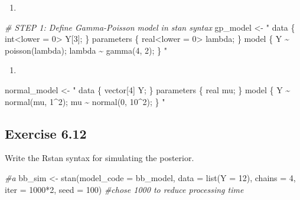 \documentclass[
]{article}
\newenvironment{Shaded}{\begin{snugshade}}{\end{snugshade}}
\newcommand{\AttributeTok}[1]{\textcolor[rgb]{0.77,0.63,0.00}{#1}}
\newcommand{\CommentTok}[1]{\textcolor[rgb]{0.56,0.35,0.01}{\textit{#1}}}
\newcommand{\DecValTok}[1]{\textcolor[rgb]{0.00,0.00,0.81}{#1}}
\newcommand{\FunctionTok}[1]{\textcolor[rgb]{0.00,0.00,0.00}{#1}}
\newcommand{\NormalTok}[1]{#1}
\newcommand{\OtherTok}[1]{\textcolor[rgb]{0.56,0.35,0.01}{#1}}
\newcommand{\SpecialCharTok}[1]{\textcolor[rgb]{0.00,0.00,0.00}{#1}}
\newcommand{\StringTok}[1]{\textcolor[rgb]{0.31,0.60,0.02}{#1}}
\providecommand{\tightlist}{%
  \setlength{\itemsep}{0pt}\setlength{\parskip}{0pt}}
\begin{document}
\begin{enumerate}
\def\labelenumi{\alph{enumi})}
\setcounter{enumi}{1}
\tightlist
\item
\end{enumerate}

\begin{Shaded}
\begin{Highlighting}[]
\CommentTok{\# STEP 1: Define Gamma{-}Poisson model in stan syntax }
\NormalTok{gp\_model }\OtherTok{\textless{}{-}} \StringTok{"}
\StringTok{  data \{}
\StringTok{    int\textless{}lower = 0\textgreater{} Y[3];}
\StringTok{  \}}
\StringTok{  parameters \{}
\StringTok{    real\textless{}lower = 0\textgreater{} lambda;}
\StringTok{  \}}
\StringTok{  model \{}
\StringTok{    Y \textasciitilde{} poisson(lambda);}
\StringTok{    lambda \textasciitilde{} gamma(4, 2);}
\StringTok{  \}}
\StringTok{"}
\end{Highlighting}
\end{Shaded}

\begin{enumerate}
\def\labelenumi{\alph{enumi})}
\setcounter{enumi}{2}
\tightlist
\item
\end{enumerate}

\begin{Shaded}
\begin{Highlighting}[]
\NormalTok{normal\_model }\OtherTok{\textless{}{-}} \StringTok{"}
\StringTok{data \{}
\StringTok{    vector[4] Y; }
\StringTok{\} }
\StringTok{parameters \{}
\StringTok{    real mu;}
\StringTok{\} }
\StringTok{model \{}
\StringTok{   Y \textasciitilde{} normal(mu, 1\^{}2);}
\StringTok{   mu \textasciitilde{} normal(0, 10\^{}2);}
\StringTok{\}}
\StringTok{"}
\end{Highlighting}
\end{Shaded}

\hypertarget{exercise-6.12}{%
\subsection{Exercise 6.12}\label{exercise-6.12}}

Write the Rstan syntax for simulating the posterior.

\begin{Shaded}
\begin{Highlighting}[]
\CommentTok{\#a}
\NormalTok{bb\_sim }\OtherTok{\textless{}{-}} \FunctionTok{stan}\NormalTok{(}\AttributeTok{model\_code =}\NormalTok{ bb\_model, }\AttributeTok{data =} \FunctionTok{list}\NormalTok{(}\AttributeTok{Y =} \DecValTok{12}\NormalTok{), }
               \AttributeTok{chains =} \DecValTok{4}\NormalTok{, }\AttributeTok{iter =} \DecValTok{1000}\SpecialCharTok{*}\DecValTok{2}\NormalTok{, }\AttributeTok{seed =} \DecValTok{100}\NormalTok{) }\CommentTok{\#chose 1000 to reduce processing time}
\end{Highlighting}
\end{Shaded}
\end{document}

